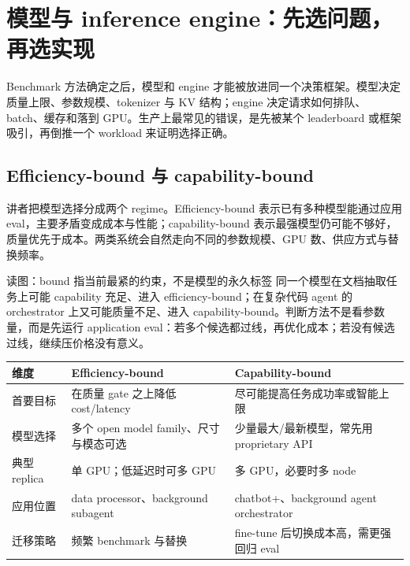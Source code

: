 \section{模型与 inference engine：先选问题，再选实现}

Benchmark 方法确定之后，模型和 engine 才能被放进同一个决策框架。模型决定质量上限、参数规模、tokenizer 与 KV 结构；engine 决定请求如何排队、batch、缓存和落到 GPU。生产上最常见的错误，是先被某个 leaderboard 或框架吸引，再倒推一个 workload 来证明选择正确。

\subsection{Efficiency-bound 与 capability-bound}

讲者把模型选择分成两个 regime。Efficiency-bound 表示已有多种模型能通过应用 eval，主要矛盾变成成本与性能；capability-bound 表示最强模型仍可能不够好，质量优先于成本。两类系统会自然走向不同的参数规模、GPU 数、供应方式与替换频率。


\begin{knowledgebox}{读图：bound 指当前最紧的约束，不是模型的永久标签}
同一个模型在文档抽取任务上可能 capability 充足、进入 efficiency-bound；在复杂代码 agent 的 orchestrator 上又可能质量不足、进入 capability-bound。判断方法不是看参数量，而是先运行 application eval：若多个候选都过线，再优化成本；若没有候选过线，继续压价格没有意义。
\end{knowledgebox}

\begin{center}
\small
\begin{tabularx}{\textwidth}{L{3cm}YY}
\toprule
维度 & Efficiency-bound & Capability-bound \\
\midrule
首要目标 & 在质量 gate 之上降低 cost/latency & 尽可能提高任务成功率或智能上限 \\
模型选择 & 多个 open model family、尺寸与模态可选 & 少量最大/最新模型，常先用 proprietary API \\
典型 replica & 单 GPU；低延迟时可多 GPU & 多 GPU，必要时多 node \\
应用位置 & data processor、background subagent & chatbot+、background agent orchestrator \\
迁移策略 & 频繁 benchmark 与替换 & fine-tune 后切换成本高，需更强回归 eval \\
\bottomrule
\end{tabularx}
\end{center}

